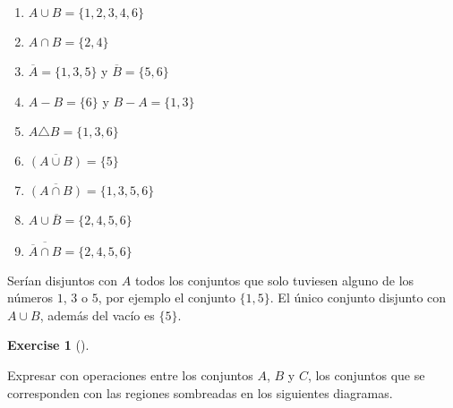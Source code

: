 \documentclass[
  letterpaper,
  DIV=11,
  numbers=noendperiod]{scrreport}
\providecommand{\tightlist}{%
  \setlength{\itemsep}{0pt}\setlength{\parskip}{0pt}}\usepackage{longtable,booktabs,array}
\theoremstyle{definition}
\newtheorem{exercise}{Exercise}[chapter]
\theoremstyle{remark}
\begin{document}
\begin{tcolorbox}[enhanced jigsaw, bottomtitle=1mm, opacityback=0, coltitle=black, toprule=.15mm, colback=white, titlerule=0mm, rightrule=.15mm, title=\textcolor{quarto-callout-tip-color}{\faLightbulb}\hspace{0.5em}{Solución}, breakable, bottomrule=.15mm, colbacktitle=quarto-callout-tip-color!10!white, toptitle=1mm, opacitybacktitle=0.6, left=2mm, leftrule=.75mm, colframe=quarto-callout-tip-color-frame, arc=.35mm]

\begin{enumerate}
\def\labelenumi{\alph{enumi}.}
\tightlist
\item
  \(A\cup B = \{1, 2, 3, 4, 6\}\)
\item
  \(A\cap B = \{2, 4\}\)
\item
  \(\overline A = \{1, 3, 5\}\) y \(\overline B = \{5, 6\}\)
\item
  \(A-B = \{6\}\) y \(B-A = \{1,3\}\)
\item
  \(A\triangle B = \{1, 3, 6\}\)
\item
  \(\overline{(A\cup B)} = \{5\}\)
\item
  \(\overline{(A\cap B)} = \{1,3, 5, 6\}\)
\item
  \(A\cup \overline B = \{2, 4, 5, 6\}\)
\item
  \(\overline{\overline A \cap B} = \{2, 4, 5, 6\}\)
\end{enumerate}

Serían disjuntos con \(A\) todos los conjuntos que solo tuviesen alguno
de los números \(1\), \(3\) o \(5\), por ejemplo el conjunto
\(\{1, 5\}\). El único conjunto disjunto con \(A\cup B\), además del
vacío es \(\{5\}\).

\end{tcolorbox}

\leavevmode{}%
\begin{exercise}[]\label{exr-2}

Expresar con operaciones entre los conjuntos \(A\), \(B\) y \(C\), los
conjuntos que se corresponden con las regiones sombreadas en los
siguientes diagramas.

\end{exercise}
\end{document}

